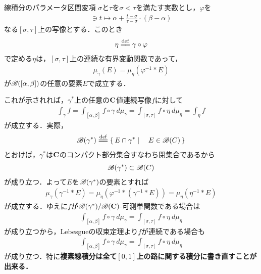 	\begin{itembox}[l]{線積分のパラメータ区間変項}
		$\sigma$と$\tau$を$\sigma < \tau$を満たす実数とし，$\varphi$を
		\begin{align}
			[\sigma,\tau] \ni t \longmapsto \alpha + \frac{t - \sigma}{\tau - \sigma} \cdot (\beta - \alpha)
		\end{align}
		なる$[\sigma,\tau]$上の写像とする．このとき
		\begin{align}
			\eta \defeq \gamma \circ \varphi
		\end{align}
		で定める$\eta$は，$[\sigma,\tau]$上の連続な有界変動関数であって，
		\begin{align}
			\mu_{\gamma}(E) = \mu_{\eta} \left(\varphi^{-1} \ast E\right)
		\end{align}
		が$\mathscr{B}([\alpha,\beta])$の任意の要素$E$で成立する．
	\end{itembox}
	
	これが示されれば，$\gamma^*$上の任意の$\mathbf{C}$値連続写像$f$に対して
	\begin{align}
		\int_{\gamma} f = \int_{[\alpha,\beta]} f \circ \gamma\ d\mu_{\gamma}
		= \int_{[\sigma,\tau]} f \circ \eta\ d\mu_{\eta} = \int_{\eta} f
		\label{fom:change_of_parameter_interval_complex_contour_integral}
	\end{align}
	が成立する．実際，
	\begin{align}
		\borel{\gamma^*} \defeq \Set{E \cap \gamma^*}{E \in \borel{C}}
	\end{align}
	とおけば，$\gamma^*$は$\mathbf{C}$のコンパクト部分集合すなわち閉集合であるから
	\begin{align}
		\mathscr{B}(\gamma^*) \subset \mathscr{B}(C)
	\end{align}
	が成り立つ．よって$E$を$\mathscr{B}(\gamma^*)$の要素とすれば
	\begin{align}
		\mu_{\gamma}\left(\gamma^{-1} \ast E\right)
		= \mu_{\eta}\left(\varphi^{-1} \ast (\gamma^{-1} \ast E)\right)
		= \mu_{\eta}\left(\eta^{-1} \ast E\right)
	\end{align}
	が成立する．ゆえに$f$が$\mathscr{B}(\gamma^*)/\mathscr{B}(\mathbf{C})$-可測単関数である場合は
	\begin{align}
		\int_{[\alpha,\beta]} f \circ \gamma\ d\mu_{\gamma} = \int_{[\sigma,\tau]} f \circ \eta\ d\mu_{\eta}
	\end{align}
	が成り立つから，Lebesgueの収束定理より$f$が連続である場合も
	\begin{align}
		\int_{[\alpha,\beta]} f \circ \gamma\ d\mu_{\gamma} = \int_{[\sigma,\tau]} f \circ \eta\ d\mu_{\eta}
	\end{align}
	が成り立つ．特に{\bf 複素線積分は全て$[0,1]$上の路に関する積分に書き直すことが出来る．}
	
